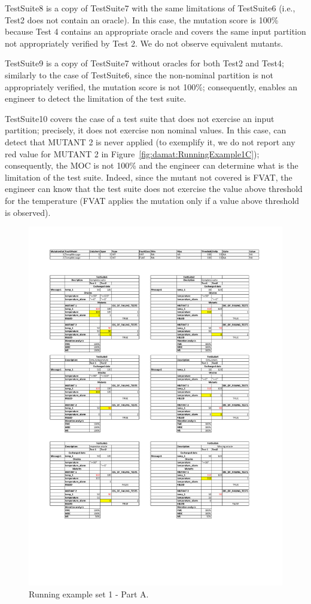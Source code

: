 TestSuite8 is a copy of TestSuite7 with the same limitations of TestSuite6 (i.e., Test2 does not contain an oracle).
In this case, the mutation score is 100\% because Test 4 contains an appropriate oracle and covers the same input partition not appropriately verified by Test 2. We do not observe equivalent mutants.

TestSuite9 is a copy of TestSuite7 without oracles for both Test2 and Test4; similarly to the case of TestSuite6, since the non-nominal partition is not appropriately verified, the mutation score is not 100\%; consequently, \APPR enables an engineer to detect the limitation of the test suite.

TestSuite10 covers the case of a test suite that does not exercise an input partition; precisely, it does not exercise non nominal values.
In this case, \APPR can detect that MUTANT 2 is never applied (to exemplify it, we do not report any red value for MUTANT 2 in Figure~\ref{fig:damat:RunningExample1C}); consequently, the MOC is not 100\% and the engineer can determine what is the limitation of the test suite. Indeed, since the mutant not covered is FVAT, the engineer can know that the test suite does not exercise the value above threshold for the temperature (FVAT applies the mutation only if a value above threshold is observed).

\begin{figure}[tb]
\centering
\includegraphics[width=18cm]{damat/DataDrivenExample1A}
\caption{Running example set 1 - Part A.}
\label{fig:damat:RunningExample1A}
\end{figure}


